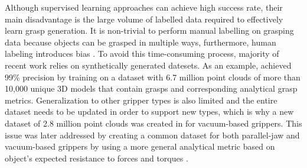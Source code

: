 Although supervised learning approaches can achieve high success rate, their main disadvantage is the large volume of labelled data required to effectively learn grasp generation. It is non-trivial to perform manual labelling on grasping data because objects can be grasped in multiple ways, furthermore, human labeling introduces bias \cite{pinto_supersizing_2015}. To avoid this time-consuming process, majority of recent work relies on synthetically generated datesets. As an example, \citet{mahler_dex-net_2017} achieved 99\% precision by training on a dataset with 6.7 million point clouds of more than 10,000 unique 3D models that contain grasps and corresponding analytical grasp metrics. Generalization to other gripper types is also limited and the entire dataset needs to be updated in order to support new types, which is why a new dataset of 2.8 million point clouds was created in \citet{mahler_dex-net_2018} for vacuum-based grippers. This issue was later addressed by creating a common dataset for both parallel-jaw and vacuum-based grippers by using a more general analytical metric based on object's expected resistance to forces and torques \cite{mahler_learning_2019}.

